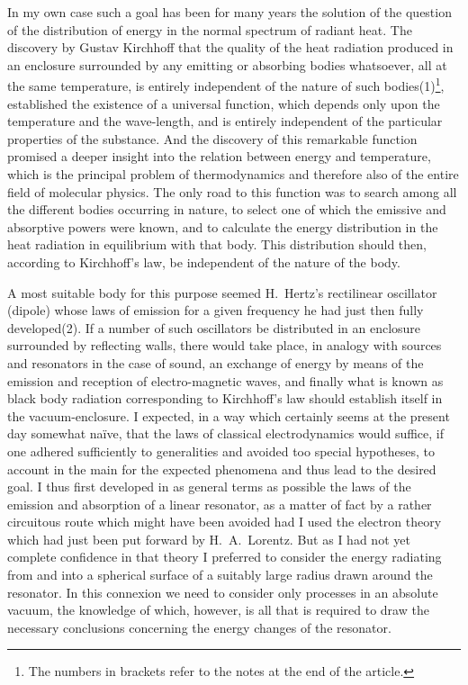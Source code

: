 \documentclass[12pt,oneside]{book}
\begin{document}
In my own case such a goal has been for many years
the solution of the question of the distribution of energy in
the normal spectrum of radiant heat. The discovery by
Gustav Kirchhoff that the quality of the heat radiation
produced in an enclosure surrounded by any
emitting or absorbing bodies whatsoever, all at the same
temperature, is entirely independent of the nature of such
bodies(1)\footnote[1]{The numbers in brackets refer to the notes at the end of the article.},
established the existence of a universal function,
which depends only upon the temperature and the wave-length,
and is entirely independent of the particular properties
of the substance. And the discovery of this remarkable
function promised a deeper insight into the relation
between energy and temperature, which is the principal
problem of thermodynamics and therefore also of the
entire field of molecular physics. The only road to this
function was to search among all the different bodies
occurring in nature, to select one of which the emissive and
absorptive powers were known, and to calculate the energy
distribution in the heat radiation in equilibrium with that
body. This distribution should then, according to Kirchhoff's
law, be independent of the nature of the body.

A most suitable body for this purpose seemed H.~Hertz's
rectilinear oscillator (dipole) whose laws of emission for a
given frequency he had just then fully
developed(2). If a number of such oscillators be distributed in an enclosure
surrounded by reflecting walls, there would take place, in
analogy with sources and resonators in the case of sound,
an exchange of energy by means of the emission and
reception of electro-magnetic waves, and finally what is
known as black body radiation corresponding to Kirchhoff's
law should establish itself in the vacuum-enclosure. I expected,
in a way which certainly seems at the present day
somewhat na\"{i}ve, that the laws of classical electrodynamics
would suffice, if one adhered sufficiently to generalities and
avoided too special hypotheses, to account in the main for
the expected phenomena and thus lead to the desired goal.
I thus first developed in as general terms as possible the
laws of the emission and absorption of a linear resonator,
as a matter of fact by a rather circuitous route which might
have been avoided had I used the electron theory which
had just been put forward by H.~A.~Lorentz. But as I had
not yet complete confidence in that theory I preferred to
consider the energy radiating from and into a spherical
surface of a suitably large radius drawn around the
resonator. In this connexion we need to consider only
processes in an absolute vacuum, the knowledge of which,
however, is all that is required to draw the necessary conclusions
concerning the energy changes of the resonator.
\end{document}
